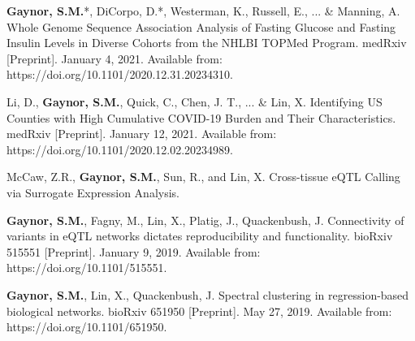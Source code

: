 \begin{cvpapers}
	
	\cvpaper
	{\textbf{Gaynor, S.M.}*, DiCorpo, D.*, Westerman, K., Russell, E., ... \& Manning, A. Whole Genome Sequence Association Analysis of Fasting Glucose and Fasting Insulin Levels in Diverse Cohorts from the NHLBI TOPMed Program. medRxiv [Preprint]. January 4, 2021. Available from: https://doi.org/10.1101/2020.12.31.20234310.} %
	{} %
	{ } %
	{} %
	
	\cvpaper
	{Li, D., \textbf{Gaynor, S.M.}, Quick, C., Chen, J. T., ... \& Lin, X. Identifying US Counties with High Cumulative COVID-19 Burden and Their Characteristics. medRxiv [Preprint]. January 12, 2021. Available from: https://doi.org/10.1101/2020.12.02.20234989.} %
		{} %
	{ } %
	{} %
	
	\cvpaper
	{McCaw, Z.R., \textbf{Gaynor, S.M.}, Sun, R.,  and Lin, X. Cross-tissue eQTL Calling via Surrogate Expression Analysis.} %
	{} %
	{ } %
	{} %
	
	\cvpaper
	{\textbf{Gaynor, S.M.}, Fagny, M., Lin, X., Platig, J., Quackenbush, J. Connectivity of variants in eQTL networks dictates reproducibility and functionality. bioRxiv 515551 [Preprint]. January 9, 2019. Available from: https://doi.org/10.1101/515551.} %
	{} %
	{ } %
	{} %
	
	\cvpaper
	{\textbf{Gaynor, S.M.}, Lin, X., Quackenbush, J. Spectral clustering in regression-based biological networks. bioRxiv 651950 [Preprint]. May 27, 2019. Available from: https://doi.org/10.1101/651950.} %
	{} %
	{ } %
	{} %
	
	
	
\end{cvpapers}